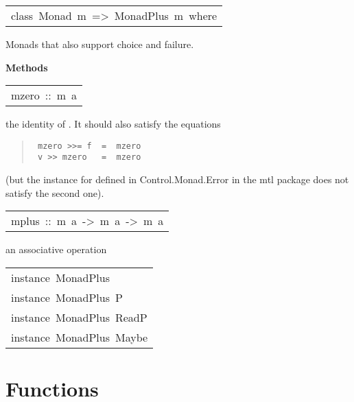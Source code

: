 \begin{haddockdesc}
\item[\begin{tabular}{@{}l}
class\ Monad\ m\ =>\ MonadPlus\ m\ where
\end{tabular}]\haddockbegindoc
Monads that also support choice and failure.
\par

\haddockpremethods{}\textbf{Methods}
\begin{haddockdesc}
\item[\begin{tabular}{@{}l}
mzero\ ::\ m\ a
\end{tabular}]\haddockbegindoc
the identity of .  It should also satisfy the equations
\par
\begin{quote}
{\haddockverb\begin{verbatim}
 mzero >>= f  =  mzero
 v >> mzero   =  mzero
\end{verbatim}}
\end{quote}
(but the instance for  defined in Control.Monad.Error
 in the mtl package does not satisfy the second one).
\par

\end{haddockdesc}
\begin{haddockdesc}
\item[\begin{tabular}{@{}l}
mplus\ ::\ m\ a\ ->\ m\ a\ ->\ m\ a
\end{tabular}]\haddockbegindoc
an associative operation
\par

\end{haddockdesc}
\end{haddockdesc}
\begin{haddockdesc}
\item[\begin{tabular}{@{}l}
instance\ MonadPlus\ {\char 91}{\char 93}\\instance\ MonadPlus\ P\\instance\ MonadPlus\ ReadP\\instance\ MonadPlus\ Maybe
\end{tabular}]
\end{haddockdesc}
\section{Functions
}
